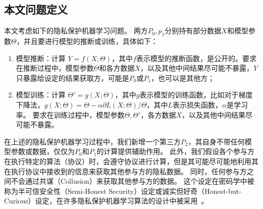 \subsection{本文问题定义}
本文考虑如下的隐私保护机器学习问题。
两方$P_0, p_1$分别持有部分数据$X$和模型参数$\Theta$，并且要进行模型的推断或训练，具体如下：
\begin{enumerate}
    \item 模型推断：计算 $Y = f(X; \Theta)$，其中$f$表示模型的推断函数，是公开的。要求在推断过程中，模型参数$\Theta$和各方数据$X$，以及其他中间结果尽可能不暴露，$Y$只暴露给设定的结果获取方，可能是$P_0$或$P_1$，也可以是其他方；
    \item 模型训练：计算 $\Theta' = g(X; \Theta)$，其中$g$表示模型的训练函数，比如对于梯度下降法，$g(X;\Theta) = \Theta - \alpha \partial L(X;\Theta) / \Theta$，其中$L$表示损失函数，$\alpha$是学习率。
    要求在训练过程中，模型参数$\Theta, \Theta'$，各方数据$X$，以及其他中间结果尽可能不暴露。
\end{enumerate}

在上述的隐私保护机器学习过程中，我们新增一个第三方$P_2$，其自身不带任何模型参数或数据，仅仅为$P_0$和$P_1$的计算提供辅助作用。
此外，我们假设各个参与方在执行特定的算法（协议）时，会遵守协议进行计算，但是其可能尽可能地利用其在执行协议中接收到的信息来获取其他参与方的隐私数据。
同时，任何参与方之间不会通过共谋（Collusion）来获取其他参与方的数据。
%
这个设定在密码学中被称为半可信安全性（Semi-Honest Security）设定或诚实但好奇（Honest-but-Curious）设定，在许多隐私保护机器学习算法的设计中被采用~\cite{}。